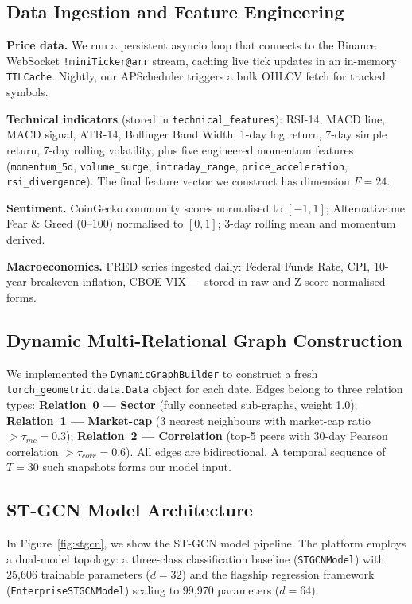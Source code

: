 \documentclass{article}
\begin{document}
\subsection{Data Ingestion and Feature Engineering}

\textbf{Price data.} We run a persistent asyncio loop that connects to the Binance WebSocket \texttt{!miniTicker@arr} stream, caching live tick updates in an in-memory \texttt{TTLCache}. Nightly, our APScheduler triggers a bulk OHLCV fetch for tracked symbols.

\textbf{Technical indicators} (stored in \texttt{technical\_features}): RSI-14, MACD line, MACD signal, ATR-14, Bollinger Band Width, 1-day log return, 7-day simple return, 7-day rolling volatility, plus five engineered momentum features (\texttt{momentum\_5d}, \texttt{volume\_surge}, \texttt{intraday\_range}, \texttt{price\_acceleration}, \texttt{rsi\_divergence}). The final feature vector we construct has dimension $F=24$.

\textbf{Sentiment.} CoinGecko community scores normalised to $[-1,1]$; Alternative.me Fear \& Greed (0--100) normalised to $[0,1]$; 3-day rolling mean and momentum derived.

\textbf{Macroeconomics.} FRED series ingested daily: Federal Funds Rate, CPI, 10-year breakeven inflation, CBOE VIX --- stored in raw and Z-score normalised forms.

\subsection{Dynamic Multi-Relational Graph Construction}

We implemented the \texttt{DynamicGraphBuilder} to construct a fresh \texttt{torch\_geometric.data.Data} object for each date. Edges belong to three relation types: \textbf{Relation~0 --- Sector} (fully connected sub-graphs, weight 1.0); \textbf{Relation~1 --- Market-cap} (3 nearest neighbours with market-cap ratio $>\tau_{mc}=0.3$); \textbf{Relation~2 --- Correlation} (top-5 peers with 30-day Pearson correlation $>\tau_{corr}=0.6$). All edges are bidirectional. A temporal sequence of $T=30$ such snapshots forms our model input.

\subsection{ST-GCN Model Architecture}

In Figure~\ref{fig:stgcn}, we show the ST-GCN model pipeline. The platform employs a dual-model topology: a three-class classification baseline (\texttt{STGCNModel}) with 25,606 trainable parameters ($d=32$) and the flagship regression framework (\texttt{EnterpriseSTGCNModel}) scaling to 99,970 parameters ($d=64$).
\end{document}
